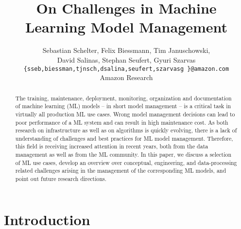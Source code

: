 \documentclass[11pt]{article}
\begin{document}
\title{On Challenges in Machine Learning Model Management}
%
\author{Sebastian Schelter, Felix Biessmann, Tim Januschowski,\\ David Salinas, Stephan Seufert, Gyuri Szarvas \\
{\small \texttt{\{sseb,biessman,tjnsch,dsalina,seufert,szarvasg
\}@amazon.com}}\\
Amazon Research
}


\maketitle

\begin{abstract}
The training, maintenance, deployment, monitoring, organization and documentation of machine learning (ML) models -- in short model management --
is a critical task in virtually all production ML use cases. Wrong model management decisions can lead to poor performance of a ML system and can result in high maintenance cost. As both research on infrastructure as well as on algorithms is quickly evolving, there is a lack of understanding of challenges and best practices for ML model management. Therefore, this field is receiving increased attention in recent years, both from the data management as well as from the ML community. In this paper, we discuss a selection of ML use cases, develop an overview over conceptual, engineering, and data-processing related challenges arising in the management of the corresponding ML models, and point out future research directions.
\end{abstract}

\section{Introduction}
\end{document}
